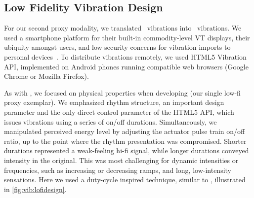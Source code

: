         

\subsection{Low Fidelity Vibration Design} 
For our second proxy modality, we translated \hifi~vibrations into \lofi~vibrations.
We used a smartphone platform for their built-in commodity-level VT displays, their ubiquity amongst users, and low security concerns for vibration imports to personal devices~\cite{Felt2012}.
To distribute vibrations remotely, we used HTML5 Vibration API, implemented on Android phones running compatible web browsers (Google Chrome or Mozilla Firefox).

As with \linear, we focused on physical properties when developing \lofi (our single low-fi proxy exemplar).
We emphasized rhythm structure, an important design parameter \cite{Ternes2008} and the only direct control parameter of the HTML5 API, which issues vibrations using a series of on/off durations.
Simultaneously, we manipulated perceived energy level by adjusting the actuator pulse train on/off ratio, up to the point where the rhythm presentation was compromised.
Shorter durations represented a weak-feeling hi-fi signal, while longer durations conveyed intensity in the original.
This was most challenging for dynamic intensities or frequencies, such as increasing or decreasing ramps, and long, low-intensity sensations.
Here we used a duty-cycle inspired technique, similar to \cite{Israr2015}, illustrated in \autoref{fig:vib:lofidesign}.
%

